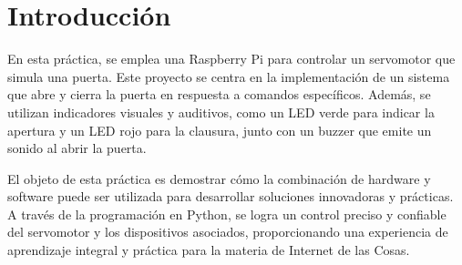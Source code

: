 \section{Introducción}

En esta práctica, se emplea una Raspberry Pi para controlar un servomotor que simula una puerta. Este proyecto se centra en la implementación de un sistema que abre y cierra la puerta en respuesta a comandos específicos. Además, se utilizan indicadores visuales y auditivos, como un LED verde para indicar la apertura y un LED rojo para la clausura, junto con un buzzer que emite un sonido al abrir la puerta.

El objeto de esta práctica es demostrar cómo la combinación de hardware y software puede ser utilizada para desarrollar soluciones innovadoras y prácticas. A través de la programación en Python, se logra un control preciso y confiable del servomotor y los dispositivos asociados, proporcionando una experiencia de aprendizaje integral y práctica para la materia de Internet de las Cosas.

\newpage